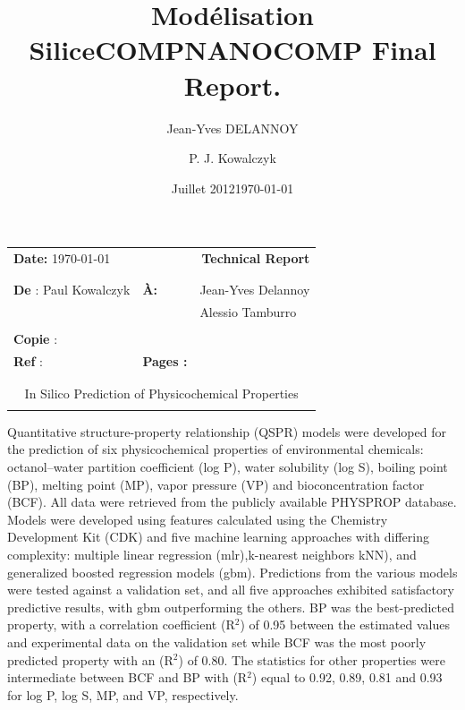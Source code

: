 \documentclass[10pt, letter]{article}
\title{Modélisation Silice}
\date{Juillet 2012}
\author{Jean-Yves DELANNOY}
\renewcommand{\=}{\, =\, }
\newcommand{\+}{\, +\, }
\renewcommand{\-}{\, -\, }
\begin{document}
\title{\textbf{COMPNANOCOMP Final Report.}}


\author{P. J. Kowalczyk}
\date{\today}

\vspace*{1cm}
\hspace*{-1cm}\begin{tabular}{p{}p{}p{}}
{\bf Date:} \today & \multicolumn{2}{r}{{\huge \bf{Technical Report }}}\\
\\
\hline
\\
{\bf De} : Paul Kowalczyk  & \bf{\`A:} & Jean-Yves Delannoy \\
&& Alessio Tamburro \\

 \\
{\bf Copie} :   \\
{\bf Ref} :&  {\bf Pages : }  & \pageref{LastPage} \\
\\
\hline
\\
\multicolumn{3}{c}{\LARGE In Silico Prediction of Physicochemical Properties} \\
\\
\hline
\end{tabular}
%
\vspace*{2cm}

Quantitative structure-property relationship (QSPR) models were developed for the
prediction of six physicochemical properties of environmental chemicals: octanol–water
partition coefficient (log P), water solubility (log S), boiling point (BP), melting point (MP),
vapor pressure (VP) and bioconcentration factor (BCF). All data were retrieved from the publicly available PHYSPROP database. Models were developed using
features calculated using the Chemistry Development Kit (CDK) and five machine learning approaches with differing complexity: multiple
linear regression (mlr),k-nearest neighbors kNN), and generalized boosted regression models (gbm). Predictions from the various models were tested
against a validation set, and all five approaches exhibited satisfactory predictive results, with
gbm outperforming the others. BP was the best-predicted property, with a correlation
coefficient (R\(^{2}\)) of 0.95 between the estimated values and experimental data on the
validation set while BCF was the most poorly predicted property with an (R\(^{2}\)) of 0.80. The
statistics for other properties were intermediate between BCF and BP with (R\(^{2}\)) equal to 0.92,
0.89, 0.81 and 0.93 for log P, log S, MP, and VP, respectively.  
\end{document}

